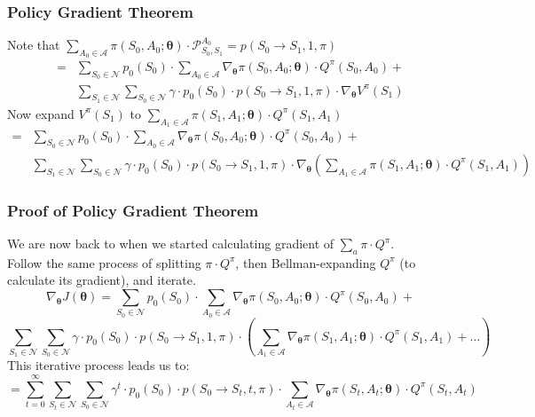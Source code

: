\documentclass[handout]{beamer}
\begin{document}
\begin{frame}
\frametitle{Policy Gradient Theorem}
\pause
Note that $\sum_{A_0 \in \mathcal{A}} \pi(S_0, A_0; \bm{\theta}) \cdot \mathcal{P}_{S_0,S_1}^{A_0} = p(S_0 \rightarrow S_1, 1, \pi)$
\pause
\begin{align*}
= & \sum_{S_0 \in \mathcal{N}} p_0(S_0) \cdot \sum_{A_0 \in \mathcal{A}} \nabla_{\bm{\theta}} \pi(S_0, A_0; \bm{\theta}) \cdot Q^{\pi}(S_0, A_0) + \\
& \sum_{S_1 \in \mathcal{N}}  \sum_{S_0 \in \mathcal{N}} \gamma \cdot p_0(S_0) \cdot p(S_0 \rightarrow S_1, 1, \pi) \cdot \nabla_{\bm{\theta}}V^{\pi}(S_1)
\end{align*}
\pause
Now expand $V^{\pi}(S_1)$ to $\sum_{A_1 \in \mathcal{A}} \pi(S_1, A_1; \bm{\theta}) \cdot Q^{\pi}(S_1,A_1)$
\pause
\begin{align*}
= & \sum_{S_0 \in \mathcal{N}} p_0(S_0) \cdot \sum_{A_0 \in \mathcal{A}} \nabla_{\bm{\theta}} \pi(S_0, A_0; \bm{\theta}) \cdot Q^{\pi}(S_0, A_0) + \\
& \sum_{S_1 \in \mathcal{N}}  \sum_{S_0 \in \mathcal{N}} \gamma \cdot p_0(S_0) \cdot p(S_0 \rightarrow S_1, 1, \pi) \cdot \nabla_{\bm{\theta}} (\sum_{A_1 \in \mathcal{A}} \pi(S_1, A_1; \bm{\theta}) \cdot Q^{\pi}(S_1,A_1)) 
\end{align*}
\end{frame}

\begin{frame}
\frametitle{Proof of Policy Gradient Theorem}
\pause
We are now back to when we started calculating gradient of $\sum_a \pi \cdot Q^{\pi}$.\\
\pause
Follow the same process of splitting $\pi \cdot Q^{\pi}$, then Bellman-expanding $Q^{\pi}$ (to calculate its gradient), and iterate.
\pause
$$\nabla_{\bm{\theta}} J(\bm{\theta}) = \sum_{S_0 \in \mathcal{N}} p_0(S_0) \cdot \sum_{A_0 \in \mathcal{A}} \nabla_{\bm{\theta}} \pi(S_0, A_0; \bm{\theta}) \cdot Q^{\pi}(S_0, A_0) + $$
$$\sum_{S_1 \in \mathcal{N}} \sum_{S_0 \in \mathcal{N}} \gamma \cdot p_0(S_0) \cdot p(S_0 \rightarrow S_1, 1, \pi) \cdot  (\sum_{A_1 \in \mathcal{A}} \nabla_{\bm{\theta}} \pi(S_1, A_1; \bm{\theta}) \cdot Q^{\pi}(S_1,A_1) + \ldots)$$
\pause
This iterative process leads us to:
$$= \sum_{t=0}^\infty \sum_{S_t \in \mathcal{N}} \sum_{S_0 \in \mathcal{N}} \gamma^t \cdot p_0(S_0) \cdot p(S_0 \rightarrow S_t, t, \pi) \cdot \sum_{A_t \in \mathcal{A}} \nabla_{\bm{\theta}} \pi(S_t, A_t; \bm{\theta}) \cdot Q^{\pi}(S_t,A_t)$$
\end{frame}
\end{document}
